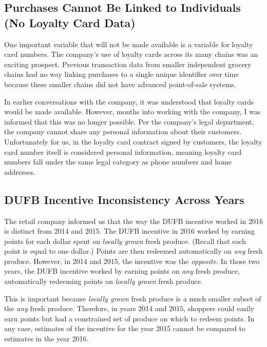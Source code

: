 \documentclass[12pt,letterpaperpaper,]{book}
\begin{document}
\subsection*{Purchases Cannot Be Linked to Individuals (No Loyalty Card
Data)}\label{purchases-cannot-be-linked-to-individuals-no-loyalty-card-data}

One important variable that will not be made available is a variable for
loyalty card numbers. The company's use of loyalty cards across its many
chains was an exciting prospect. Previous transaction data from smaller
independent grocery chains had no way linking purchases to a single
unique identifier over time because these smaller chains did not have
advanced point-of-sale systems.

In earlier conversations with the company, it was understood that
loyalty cards would be made available. However, months into working with
the company, I was informed that this was no longer possible. Per the
company's legal department, the company cannot share any personal
information about their customers. Unfortunately for us, in the loyalty
card contract signed by customers, the loyalty card number itself is
considered personal information, meaning loyalty card numbers fall under
the same legal category as phone numbers and home addresses.

\subsection*{DUFB Incentive Inconsistency Across
Years}\label{dufb-incentive-inconsistency-across-years}

The retail company informed us that the way the DUFB incentive worked in
2016 is distinct from 2014 and 2015. The DUFB incentive in 2016 worked
by earning points for each dollar spent on \emph{locally grown} fresh
produce. (Recall that each point is equal to one dollar.) Points are
then redeemed automatically on \emph{any} fresh produce. However, in
2014 and 2015, the incentive was the \emph{opposite}. In those two
years, the DUFB incentive worked by earning points on \emph{any} fresh
produce, automatically redeeming points on \emph{locally grown} fresh
produce.

This is important because \emph{locally grown} fresh produce is a much
smaller subset of the \emph{any} fresh produce. Therefore, in years 2014
and 2015, shoppers could easily earn points but had a constrained set of
produce on which to redeem points. In any case, estimates of the
incentive for the year 2015 cannot be compared to estimates in the year
2016.
\end{document}
